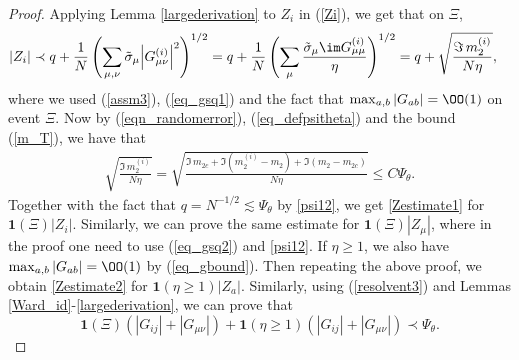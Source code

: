 \begin{proof}
 Applying Lemma \ref{largederivation} to $Z_{i}$ in (\ref{Zi}), we get that on $\Xi$,
\begin{equation}\label{estimate_Zi}
\begin{split}
\left| Z_{i}\right| & \prec  q+\frac{1}{N} \left( \sum_{\mu, \nu} \tilde \sigma_\mu {\left| G_{\mu\nu}^{(i)}  \right|^2 }  \right)^{1/2} = q+ \frac{1}{N}\left( {\sum_\mu \frac{\tilde \sigma_\mu  \im G_{\mu\mu}^{(i)} }{\eta} } \right)^{1/2}= q + \sqrt { \frac{ \Im\, m_2^{(i)}  } {N\eta} },
\end{split}
\end{equation}
where we used (\ref{assm3}), (\ref{eq_gsq1}) and the fact that $\max_{a,b}|G_{ab}|= \OO(1)$ on event $\Xi$. Now by (\ref{eqn_randomerror}), (\ref{eq_defpsitheta}) and the bound (\ref{m_T}), we have that
\begin{align}\label{m2psi}
\sqrt{\frac{{\Im\, m_2^{(i)} }}{N\eta} } = \sqrt {\frac{{\Im\,m_{2c}  + \Im ( {m_2^{(i)}  - m_2 }) + \Im ( {m_2  - m_{2c} } )}}{{N\eta }}}  \le C \Psi _\theta .
\end{align}
Together with the fact that $q= N^{-1/2} \lesssim \Psi_\theta$ by \eqref{psi12}, we get \eqref{Zestimate1} for ${\mathbf 1}(\Xi) |Z_{i}|$.
Similarly, we can prove the same estimate for ${\mathbf 1}(\Xi) |Z_{\mu}| $, where in the proof one need to use  (\ref{eq_gsq2}) and \eqref{psi12}. 
If $\eta\ge 1$, we also have $\max_{a,b}|G_{ab}|= \OO(1)$ by (\ref{eq_gbound}). Then repeating the above proof, we obtain \eqref{Zestimate2} for ${\mathbf 1}(\eta\ge 1) |Z_{a}|$.
Similarly, using (\ref{resolvent3}) and Lemmas \ref{Ward_id}-\ref{largederivation}, we can prove that %
\begin{equation}\label{2blocks}
{\mathbf 1}(\Xi) \left( |G_{ij}| + |G_{\mu\nu}|\right) + {\mathbf 1}(\eta\ge 1) \left( |G_{ij}| + |G_{\mu\nu}|\right) \prec \Psi_\theta.
\end{equation}


\end{proof}
